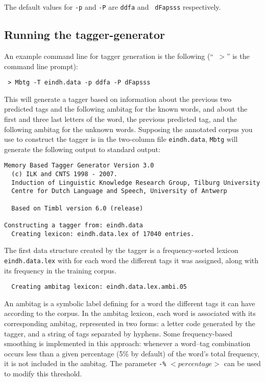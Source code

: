 \documentclass{report}
\begin{document}
The default values for {\tt -p} and {\tt -P} are {\tt ddfa} and {\tt
  dFapsss} respectively. 

\subsection{Running the tagger-generator}

An example command line for tagger generation is the following (``{\tt
$>$}'' is the command line prompt):

{\small
\begin{verbatim}
 > Mbtg -T eindh.data -p ddfa -P dFapsss
\end{verbatim}
}

This will generate a tagger based on information about the previous
two predicted tags and the following ambitag for the known words, and
about the first and three last letters of the word, the previous predicted
tag, and the following ambitag for the unknown words. Supposing the
annotated corpus you use to construct the tagger is in the two-column
file {\tt eindh.data}, {\tt Mbtg} will generate the following output
to standard output:

{\small
\begin{verbatim}
Memory Based Tagger Generator Version 3.0
  (c) ILK and CNTS 1998 - 2007.
  Induction of Linguistic Knowledge Research Group, Tilburg University
  Centre for Dutch Language and Speech, University of Antwerp

  Based on Timbl version 6.0 (release)

Constructing a tagger from: eindh.data
  Creating lexicon: eindh.data.lex of 17040 entries.
\end{verbatim}
}

The first data structure created by the tagger is a frequency-sorted
lexicon {\tt eindh.data.lex} with for each word the different tags it
was assigned, along with its frequency in the training corpus. 

{\small
\begin{verbatim}
  Creating ambitag lexicon: eindh.data.lex.ambi.05
\end{verbatim}
}

An ambitag is a symbolic label defining for a word the different
tags it can have according to the corpus.  In the ambitag lexicon,
each word is associated with its corresponding ambitag, represented in
two forms: a letter code generated by the tagger, and a string of tags
separated by hyphens. Some frequency-based smoothing is implemented in
this approach: whenever a word--tag combination occurs less than a
given percentage (5\% by default) of the word's total frequency, it is
not included in the ambitag. The parameter {\tt -\%} $<percentage>$ can be
used to modify this threshold. 
\end{document}
